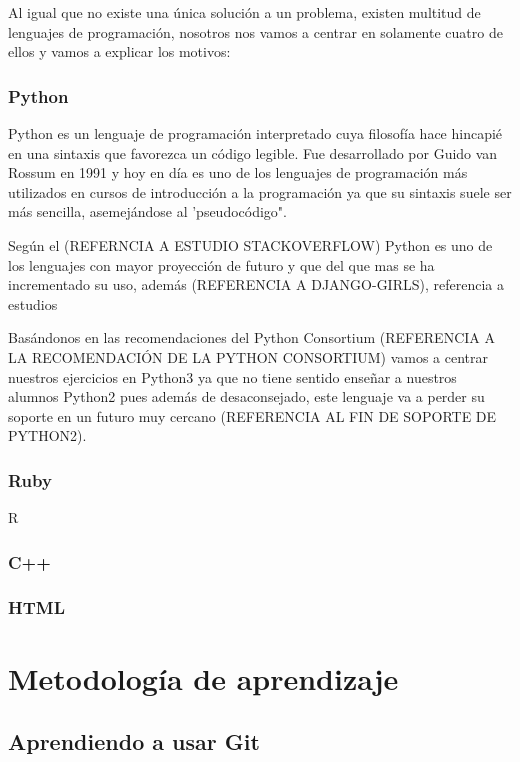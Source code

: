 Al igual que no existe una única solución a un problema, existen multitud de lenguajes de programación, nosotros nos vamos a centrar en solamente cuatro de ellos y vamos a explicar los motivos:

\subsubsection{Python}

Python es un lenguaje de programación interpretado cuya filosofía hace hincapié en una sintaxis que favorezca un código legible. Fue desarrollado por Guido van Rossum en 1991 y hoy en día es uno de los lenguajes de programación más utilizados en cursos de introducción a la programación ya que su sintaxis suele ser más sencilla, asemejándose al 'pseudocódigo".

Según el (REFERNCIA A ESTUDIO STACKOVERFLOW) Python es uno de los lenguajes con mayor proyección de futuro y que del que mas se ha incrementado su uso, además (REFERENCIA A DJANGO-GIRLS), referencia a estudios

Basándonos en las recomendaciones del Python Consortium (REFERENCIA A LA RECOMENDACIÓN DE LA PYTHON CONSORTIUM) vamos a centrar nuestros ejercicios en Python3 ya que no tiene sentido enseñar a nuestros alumnos Python2 pues además de desaconsejado, este lenguaje va a perder su soporte en un futuro muy cercano (REFERENCIA AL FIN DE SOPORTE DE PYTHON2).

\subsubsection{Ruby}

R

\subsubsection{C++}

\subsubsection{HTML}

\section{Metodología de aprendizaje}

\subsection{Aprendiendo a usar Git}

